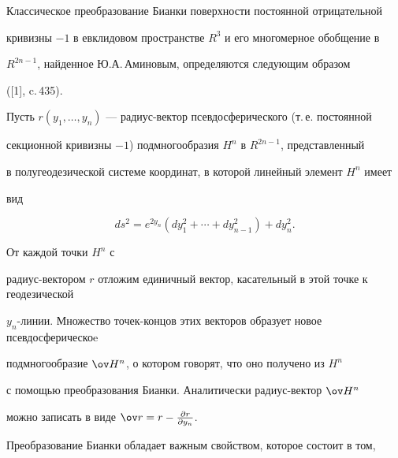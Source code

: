 

\pagestyle{plain} %







\maketitle


\label{begin}











Классическое преобразование Бианки поверхности постоянной отрицательной 


кривизны $-1$ в евклидовом пространстве $R^3$ и его многомерное обобщение в 


$R^{2n-1}$, найденное Ю.А.\,Аминовым, определяются следующим образом


([1], c.\,435). 


Пусть $r(y_1,\dotsc,y_n)$ --- радиус-вектор псевдосферического (т.\,е. постоянной 


секционной кривизны $-1$) подмногообразия $H^n$ в $R^{2n-1}$, представленный 


в полугеодезической системе координат, в которой линейный элемент $H^n$ имеет 


вид


\begin{equation}


ds^2=e^{2y_n}(dy_1^2+\dotsb+dy_{n-1}^2)+dy_n^2.


\end{equation}


От каждой точки $H^n$ с 


радиус-вектором $r$ отложим единичный вектор, касательный в этой точке к геодезической 


$y_n$-линии. Множество точек-концов этих векторов образует новое псевдосферическоe 


подмногообразие $\ov H{}^n$, о котором говорят, что оно получено из $H^n$ 


с помощью преобразования Бианки. Аналитически радиус-вектор $\ov H{}^n$ 


можно записать в виде $\ov r=r-\frac{\partial r}{\partial y_n}$.


Преобразование Бианки обладает важным свойством, которое состоит в том, 


